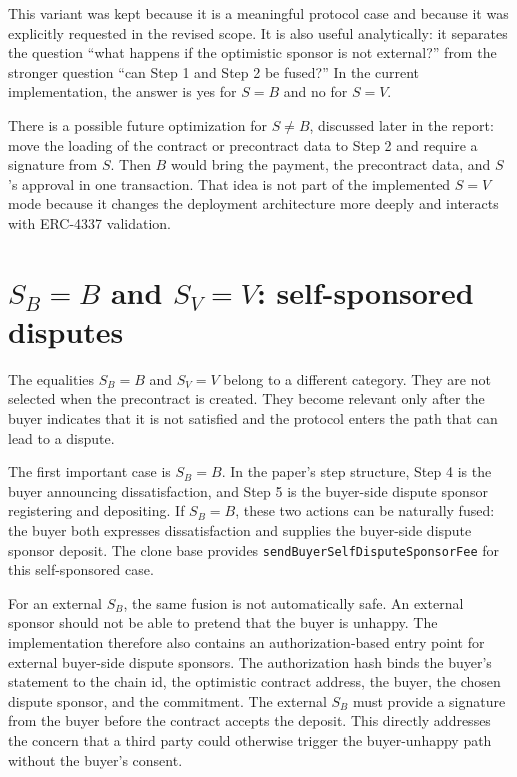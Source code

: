 This variant was kept because it is a meaningful protocol case and because it was explicitly
requested in the revised scope. It is also useful analytically: it separates the question
``what happens if the optimistic sponsor is not external?'' from the stronger question
``can Step 1 and Step 2 be fused?'' In the current implementation, the answer is yes for
\(S=B\) and no for \(S=V\).

There is a possible future optimization for \(S\ne B\), discussed later in the report: move
the loading of the contract or precontract data to Step 2 and require a signature from
\(S\). Then \(B\) would bring the payment, the precontract data, and \(S\)'s approval in one
transaction. That idea is not part of the implemented \(S=V\) mode because it changes the
deployment architecture more deeply and interacts with ERC-4337 validation.

\section[SB=B and SV=V: self-sponsored disputes]{\(S_B=B\) and \(S_V=V\): self-sponsored disputes}

The equalities \(S_B=B\) and \(S_V=V\) belong to a different category. They are not selected
when the precontract is created. They become relevant only after the buyer indicates that it
is not satisfied and the protocol enters the path that can lead to a dispute.

The first important case is \(S_B=B\). In the paper's step structure, Step 4 is the buyer
announcing dissatisfaction, and Step 5 is the buyer-side dispute sponsor registering and
depositing. If \(S_B=B\), these two actions can be naturally fused: the buyer both expresses
dissatisfaction and supplies the buyer-side dispute sponsor deposit. The clone base provides
\texttt{sendBuyerSelfDisputeSponsorFee} for this self-sponsored case.

For an external \(S_B\), the same fusion is not automatically safe. An external sponsor
should not be able to pretend that the buyer is unhappy. The implementation therefore also
contains an authorization-based entry point for external buyer-side dispute sponsors. The
authorization hash binds the buyer's statement to the chain id, the optimistic contract
address, the buyer, the chosen dispute sponsor, and the commitment. The external \(S_B\)
must provide a signature from the buyer before the contract accepts the deposit. This
directly addresses the concern that a third party could otherwise trigger the buyer-unhappy
path without the buyer's consent.

